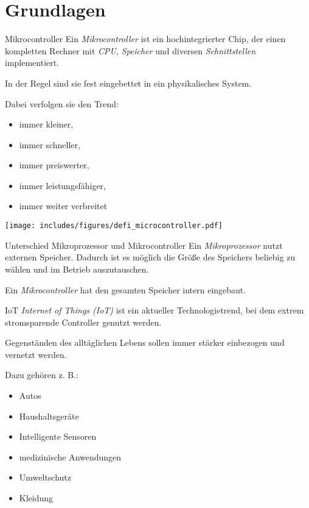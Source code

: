 \section{Grundlagen}

\begin{defi}{Mikrocontroller}
    Ein \emph{Mikrocontroller} ist ein hochintegrierter Chip, der einen kompletten Rechner mit \emph{CPU}, \emph{Speicher} und diversen \emph{Schnittstellen} implementiert.

    In der Regel sind sie fest eingebettet in ein physikalisches System.

    Dabei verfolgen sie den Trend:
    \begin{itemize}
        \item immer kleiner,
        \item immer schneller,
        \item immer preiswerter,
        \item immer leistungsfähiger,
        \item immer weiter verbreitet
    \end{itemize}

    \vspace{1em}

    \begin{center}
        \texttt{[image: includes/figures/defi\_microcontroller.pdf]}
    \end{center}
\end{defi}

\begin{bonus}{Unterschied Mikroprozessor und Mikrocontroller}
    Ein \emph{Mikroprozessor} nutzt externen Speicher.
    Dadurch ist es möglich die Größe des Speichers beliebig zu wählen und im Betrieb auszutauschen.

    Ein \emph{Mikrocontroller} hat den gesamten Speicher intern eingebaut.
\end{bonus}

\begin{defi}{IoT}
    \emph{Internet of Things (IoT)} ist ein aktueller Technologietrend, bei dem extrem stromsparende Controller genutzt werden.

    Gegenständen des alltäglichen Lebens sollen immer stärker einbezogen und vernetzt werden.

    Dazu gehören z. B.:
    \begin{itemize}
        \item Autos
        \item Haushaltsgeräte
        \item Intelligente Sensoren
        \item medizinische Anwendungen
        \item Umweltschutz
        \item Kleidung
    \end{itemize}
\end{defi}

